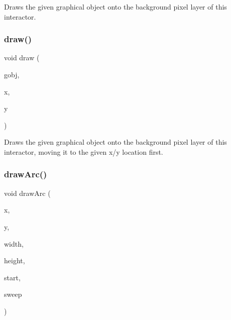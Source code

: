 Draws the given graphical object onto the background pixel layer of this interactor. 

\mbox{\label{classGDrawingSurface_a8af8762bd6720e0a1d2a84b190e3dc96}} 
\subsubsection{\texorpdfstring{draw()}{draw()}\hspace{0.1cm}{\footnotesize\ttfamily [4/4]}}
{\footnotesize\ttfamily void draw (\begin{DoxyParamCaption}\item[{\mbox{\hyperlink{classGObject}{G\+Object}} \&}]{gobj,  }\item[{double}]{x,  }\item[{double}]{y }\end{DoxyParamCaption})\hspace{0.3cm}{\ttfamily [virtual]}}



Draws the given graphical object onto the background pixel layer of this interactor, moving it to the given x/y location first. 

\mbox{\label{classGDrawingSurface_a38b6fae1045191c57092b49905068144}} 
\subsubsection{\texorpdfstring{draw\+Arc()}{drawArc()}}
{\footnotesize\ttfamily void draw\+Arc (\begin{DoxyParamCaption}\item[{double}]{x,  }\item[{double}]{y,  }\item[{double}]{width,  }\item[{double}]{height,  }\item[{double}]{start,  }\item[{double}]{sweep }\end{DoxyParamCaption})\hspace{0.3cm}{\ttfamily [virtual]}}



